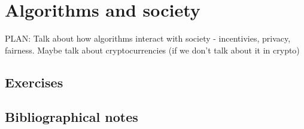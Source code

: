 \chapter{Algorithms and society}\label{Algorithms-and-society}

PLAN: Talk about how algorithms interact with society - incentivies,
privacy, fairness. Maybe talk about cryptocurrencies (if we don't talk
about it in crypto)

\section{Exercises}\label{Exercises}

\section{Bibliographical notes}\label{Bibliographical-notes}
